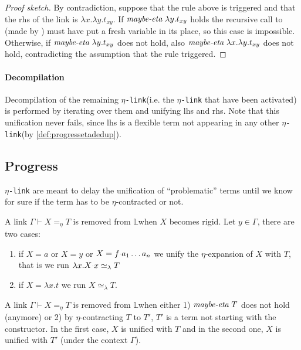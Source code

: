 \documentclass[sigconf,natbib=false,review]{acmart}
\newcommand{\appsep}{\ensuremath{\textcolor{lightgray}{\cdot}}}
\newcommand{\UnifRel}{\ensuremath{\simeq}}
\newcommand{\Ue}{\ensuremath{\UnifRel_\lambda}\xspace}
\newcommand{\linkMacro}[1]{\ensuremath{#1}\texttt{-link}\xspace}
\newcommand{\linketa} {\linkMacro{\eta}}
\newcommand{\linketaM}[3]{\ensuremath{#1 \vdash #2 =_\eta #3}}
\newcommand{\lhs}{lhs\xspace}
\newcommand{\rhs}{rhs\xspace}
\newcommand{\linkStore}{\texorpdfstring{\ensuremath{\mathbb{L}}\xspace}{L}}
\begin{document}
\begin{proof}[Proof sketch]
  By contradiction, suppose that the rule above is triggered and that
  the \rhs of the link is $\lambda x.\lambda y.t_{xy}$.
  If $\emph{maybe-eta}{}~\lambda y.t_{xy}$ holds the recursive call to
   (made by ) must have put a fresh variable
  in its place, so this case is impossible.
  Otherwise, if $\emph{maybe-eta}{}~\lambda y.t_{xy}$ does not hold, also
  $\emph{maybe-eta}{}~\lambda x.\lambda y.t_{xy}$ does not hold, contradicting
  the assumption that the rule triggered.
\end{proof}

\paragraph{Decompilation}
Decompilation of the remaining \linketa (i.e. the \linketa that have been
activated) is performed by iterating over them and unifying \lhs and \rhs. Note
that this unification never fails, since \lhs is a flexible term not appearing
in any other \linketa (by \cref{def:progressetadedup}).

\subsection{Progress}\label{sec:etaprogress}

\linketa are meant to delay the unification of ``problematic'' terms until
we know for sure if the term has to be $\eta$-contracted or not.

\newcommand{\progressetaleft}{\emph{$\eta$-progress-\lhs}\xspace}
\begin{definition}[\progressetaleft]\label{def:progressetaleft}
A link \linketaM{\Gamma}{X}{T} is removed from \linkStore when
$X$ becomes rigid. Let $y\in\Gamma$, there are two cases:
\begin{enumerate}
  \item if $X = a$ or $X = y$ or $X = f \appsep a_1\ldots a_n$
    we unify the $\eta$-expansion of $X$ with $T$, that is we run
    $\lambda x.X \appsep x\Ue{} T$
    \item if $X = \lambda x.t$ we run $X \Ue{} T$.
\end{enumerate}
\end{definition}

\newcommand{\progressetaright}{\emph{$\eta$-progress-\rhs}\xspace}
\begin{definition}[\progressetaright]\label{def:progressetaright} A link
\linketaM{\Gamma}{X}{T} is removed from \linkStore when either 1)
$\emph{maybe-eta}~T$ does not hold (anymore) or 2) by $\eta$-contracting $T$ to
$T'$, $T'$ is a term not starting with the  constructor. In the
first case, $X$ is unified with $T$ and in the second one, $X$ is unified with
$T'$ (under the context $\Gamma$).
\end{definition}
\end{document}
